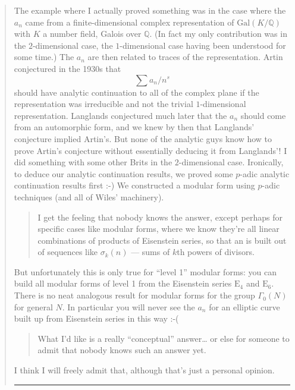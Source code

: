 \documentclass{article}
\begin{document}
\begin{quote}
The example where I actually proved something was in the case where the
\(a_n\) came from a finite-dimensional complex representation of
\(\mathrm{Gal}(K/\mathbb{Q})\) with \(K\) a number field, Galois over
\(\mathbb{Q}\). (In fact my only contribution was in the
\(2\)-dimensional case, the \(1\)-dimensional case having been
understood for some time.) The \(a_n\) are then related to traces of the
representation. Artin conjectured in the 1930s that \[\sum a_n/n^s\]
should have analytic continuation to all of the complex plane if the
representation was irreducible and not the trivial \(1\)-dimensional
representation. Langlands conjectured much later that the \(a_n\) should
come from an automorphic form, and we knew by then that Langlands'
conjecture implied Artin's. But none of the analytic guys know how to
prove Artin's conjecture without essentially deducing it from
Langlands'! I did something with some other Brits in the
\(2\)-dimensional case. Ironically, to deduce our analytic continuation
results, we proved some \(p\)-adic analytic continuation results first
:-) We constructed a modular form using \(p\)-adic techniques (and all
of Wiles' machinery).

\begin{quote}
I get the feeling that nobody knows the answer, except perhaps for
specific cases like modular forms, where we know they're all linear
combinations of products of Eisenstein series, so that an is built out
of sequences like \(\sigma_k(n)\) --- sums of \(k\)th powers of
divisors.
\end{quote}

But unfortunately this is only true for ``level 1'' modular forms: you
can build all modular forms of level 1 from the Eisenstein series
\(\mathrm{E}_4\) and \(\mathrm{E}_6\). There is no neat analogous result
for modular forms for the group \(\Gamma_0(N)\) for general \(N\). In
particular you will never see the \(a_n\) for an elliptic curve built up
from Eisenstein series in this way :-(

\begin{quote}
What I'd like is a really ``conceptual'' answer\ldots{} or else for
someone to admit that nobody knows such an answer yet.
\end{quote}

I think I will freely admit that, although that's just a personal
opinion.

\begin{center}\rule{0.5\linewidth}{0.5pt}\end{center}


\end{quote}
\end{document}
